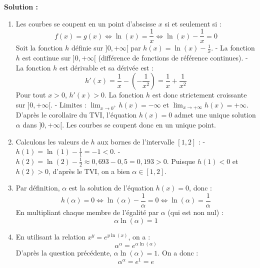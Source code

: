 \textbf{Solution :}
\begin{enumerate}
    \item Les courbes se coupent en un point d'abscisse $x$ si et seulement si :
    \[
    f(x) = g(x) \iff \ln(x) = \frac{1}{x} \iff \ln(x) - \frac{1}{x} = 0
    \]
    Soit la fonction $h$ définie sur $]0, +\infty[$ par $h(x) = \ln(x) - \frac{1}{x}$.
    - La fonction $h$ est continue sur $]0, +\infty[$ (différence de fonctions de référence continues).
    - La fonction $h$ est dérivable et sa dérivée est :
      \[
      h'(x) = \frac{1}{x} - \left( -\frac{1}{x^2} \right) = \frac{1}{x} + \frac{1}{x^2}
      \]
      Pour tout $x > 0$, $h'(x) > 0$. La fonction $h$ est donc strictement croissante sur $]0, +\infty[$.
    - Limites : $\lim_{x \to 0^+} h(x) = -\infty$ et $\lim_{x \to +\infty} h(x) = +\infty$.
    D'après le corollaire du TVI, l'équation $h(x) = 0$ admet une unique solution $\alpha$ dans $]0, +\infty[$. Les courbes se coupent donc en un unique point.
    
    \item Calculons les valeurs de $h$ aux bornes de l'intervalle $[1, 2]$ :
    - $h(1) = \ln(1) - \frac{1}{1} = -1 < 0$.
    - $h(2) = \ln(2) - \frac{1}{2} \approx 0,693 - 0,5 = 0,193 > 0$.
    Puisque $h(1) < 0$ et $h(2) > 0$, d'après le TVI, on a bien $\alpha \in [1, 2]$.
    
    \item Par définition, $\alpha$ est la solution de l'équation $h(x) = 0$, donc :
    \[
    h(\alpha) = 0 \iff \ln(\alpha) - \frac{1}{\alpha} = 0 \iff \ln(\alpha) = \frac{1}{\alpha}
    \]
    En multipliant chaque membre de l'égalité par $\alpha$ (qui est non nul) :
    \[
    \alpha \ln(\alpha) = 1
    \]
    
    \item En utilisant la relation $x^y = e^{y \ln(x)}$, on a :
    \[
    \alpha^{\alpha} = e^{\alpha \ln(\alpha)}
    \]
    D'après la question précédente, $\alpha \ln(\alpha) = 1$. On a donc :
    \[
    \alpha^{\alpha} = e^1 = e
    \]
\end{enumerate}

